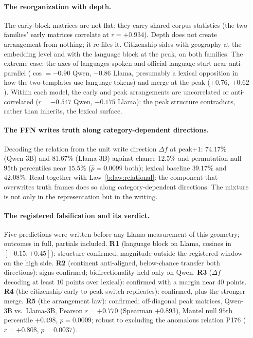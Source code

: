 \documentclass[11pt]{article}
\begin{document}
\paragraph{The reorganization with depth.} The early-block matrices are
not flat: they carry shared corpus statistics (the two families' early
matrices correlate at $r = +0.934$). Depth does not create arrangement from
nothing; it re-files it. Citizenship sides with geography at the embedding
level and with the language block at the peak, on both families. The
extreme case: the axes of languages-spoken and official-language start near
anti-parallel ($\cos = -0.90$ Qwen, $-0.86$ Llama, presumably a lexical
opposition in how the two templates use language tokens) and merge at the
peak ($+0.76$, $+0.62$). Within each model, the early and peak
arrangements are uncorrelated or anti-correlated ($r = -0.547$ Qwen,
$-0.175$ Llama): the peak structure contradicts, rather than inherits, the
lexical surface.

\paragraph{The FFN writes truth along category-dependent directions.}
Decoding the relation from the unit write direction $\Delta f$ at
peak$+1$: $74.17\%$ (Qwen-3B) and $81.67\%$ (Llama-3B) against chance
$12.5\%$ and permutation null $95$th percentiles near $15.5\%$
($\hat p = 0.0099$ both); lexical baseline $39.17\%$ and $42.08\%$. Read
together with Law~\ref{b:law:relational}: the component that overwrites truth
frames does so along category-dependent directions. The mixture is not
only in the representation but in the writing.

\paragraph{The registered falsification and its verdict.} Five predictions
were written before any Llama measurement of this geometry; outcomes in
full, partials included. \textbf{R1} (language block on Llama, cosines in
$[+0.15, +0.45]$): structure confirmed, magnitude outside the registered
window on the high side. \textbf{R2} (continent anti-aligned, below-chance
transfer both directions): signs confirmed; bidirectionality held only on
Qwen. \textbf{R3} ($\Delta f$ decoding at least $10$ points over lexical):
confirmed with a margin near $40$ points. \textbf{R4} (the citizenship
early-to-peak switch replicates): confirmed, plus the stronger merge.
\textbf{R5} (the arrangement law): confirmed; off-diagonal peak matrices,
Qwen-3B vs.\ Llama-3B, Pearson $r = +0.770$ (Spearman $+0.893$), Mantel
null $95$th percentile $+0.498$, $p = 0.0009$; robust to excluding the
anomalous relation P176 ($r = +0.808$, $p = 0.0037$).
\end{document}

